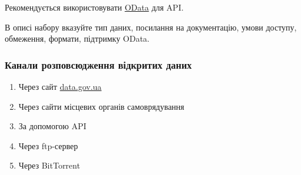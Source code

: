 Рекомендується використовувати \href{http://www.odata.org/}{OData} для API.

В описі набору вказуйте тип даних, посилання на документацію, умови доступу, обмеження, формати, підтримку OData.

\subsubsection{Канали розповсюдження відкритих даних}

\begin{enumerate}
    \item Через сайт \href{https://data.gov.ua}{data.gov.ua}
    \item Через сайти місцевих органів самоврядування
    \item За допомогою API
    \item Через ftp-сервер
    \item Через BitTorrent
\end{enumerate}
